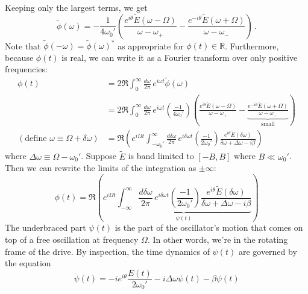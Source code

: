 \documentclass{article}
\begin{document}
Keeping only the largest terms, we get
\begin{equation}
  \tilde{\phi}(\omega) =
  - \frac{1}{4 \omega_0'}
  \left(
      \frac{e^{i \theta} \tilde{E}(\omega - \Omega)}{\omega - \omega_+}
    - \frac{e^{-i\theta} \tilde{E}(\omega + \Omega)}{\omega - \omega_-}
  \right) \, .
\end{equation}
Note that $\tilde{\phi}(-\omega) = \tilde{\phi}(\omega)^*$ as appropriate for $\phi(t) \in \mathbb{R}$.
Furthermore, because $\phi(t)$ is real, we can write it as a Fourier transform over only positive frequencies:
\begin{align*}
  \phi(t)
  &= 2 \Re \int_0^\infty \frac{d\omega}{2\pi} \, e^{i \omega t} \tilde{\phi}(\omega) \\
  &= 2 \Re \int_0^\infty \frac{d\omega}{2\pi} \, e^{i \omega t} \left( \frac{-1}{4 \omega_0'} \right)
    \left(
      \frac{e^{i \theta} \tilde{E}(\omega - \Omega)}{\omega - \omega_+}
    - \underbrace{\frac{e^{-i \theta} \tilde{E}(\omega + \Omega)}{\omega - \omega_-}}_\text{small}
    \right) \\
  (\text{define } \omega \equiv \Omega + \delta \omega)
  &= \Re
  \left(
    e^{i \Omega t}
    \int_{-\omega_0'}^\infty \frac{d \delta \omega}{2\pi} \,
    e^{i \delta \omega t}
    \left( \frac{-1}{2 \omega_0'} \right)
    \frac{e^{i \theta} \tilde{E}(\delta \omega)}{\delta \omega + \Delta \omega - i \beta}
  \right)
\end{align*}
where $\Delta \omega \equiv \Omega - \omega_0'$.
Suppose $\tilde{E}$ is band limited to $[-B, B]$ where $B \ll \omega_0'$.
Then we can rewrite the limits of the integration as $\pm \infty$:
\begin{equation}
  \phi(t) = \Re
  \left(
    e^{i \Omega t}
    \underbrace{
      \int_{-\infty}^\infty \frac{d \delta \omega}{2\pi} \,
      e^{i \delta \omega t}
      \left( \frac{-1}{2 \omega_0'} \right)
      \frac{e^{i \theta} \tilde{E}(\delta \omega)}{\delta \omega +\Delta \omega - i \beta}
    }_{\psi(t)}
  \right)
\end{equation}
The underbraced part $\psi(t)$ is the part of the oscillator's motion that comes on top of a free oscillation at frequency $\Omega$.
In other words, we're in the rotating frame of the drive.
By inspection, the time dynamics of $\psi(t)$ are governed by the equation
\begin{equation}
  \dot{\psi}(t) = -i e^{i \theta} \frac{E(t)}{2 \omega_0'} - i \Delta \omega \psi(t) - \beta \psi(t)
\end{equation}
\end{document}
